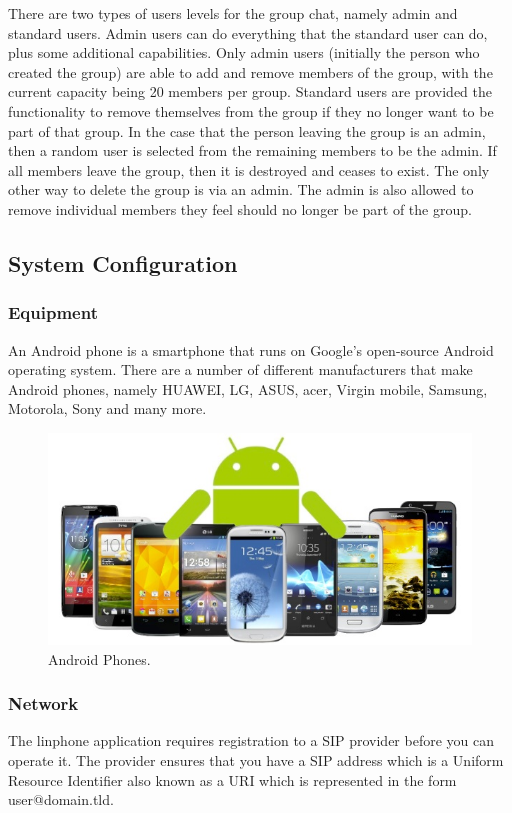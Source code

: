 \documentclass[a4paper]{article}
\begin{document}
There are two types of users levels for the group chat, namely admin and standard users. Admin users can do everything that the standard user can do, plus some additional capabilities. Only admin users (initially the person who created the group) are able to add and remove members of the group, with the current capacity being 20 members per group. Standard users are provided the functionality to remove themselves from the group if they no longer want to be part of that group. In the case that the person leaving the group is an admin, then a random user is selected from the remaining members to be the admin. If all members leave the group, then it is destroyed and ceases to exist. The only other way to delete the group is via an admin. The admin is also allowed to remove individual members they feel should no longer be part of the group.

\subsection{System Configuration}

\subsubsection{Equipment}
An Android phone is a smartphone that runs on Google's open-source Android operating system. There are a number of different manufacturers that make Android phones, namely HUAWEI, LG, ASUS, acer, Virgin mobile, Samsung, Motorola, Sony and many more.\\

\begin{center}
\begin{figure}[h]
\centering
\includegraphics[width=0.7\linewidth]{./pictures/android.jpg}
\caption{\label{fig:Agile}Android Phones.}
\end{figure}
\end{center}

\subsubsection{Network}
The linphone application requires registration to a SIP provider before you can operate it. The provider ensures that you have a SIP address which is a Uniform Resource Identifier also known as a URI which is represented in the form user@domain.tld. \\
\end{document}
